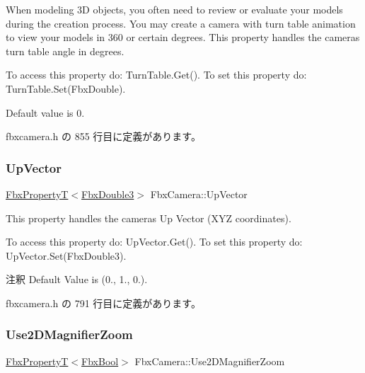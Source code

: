 When modeling 3D objects, you often need to review or evaluate your models during the creation process. You may create a camera with turn table animation to view your models in 360 or certain degrees. This property handles the camera\textquotesingle{}s turn table angle in degrees.

To access this property do\+: Turn\+Table.\+Get(). To set this property do\+: Turn\+Table.\+Set(\+Fbx\+Double).

Default value is 0. 

 fbxcamera.\+h の 855 行目に定義があります。

\mbox{\label{class_fbx_camera_ad2e9b17c1be832d71d4fc0eecc93732a}} 
\subsubsection{\texorpdfstring{Up\+Vector}{UpVector}}
{\footnotesize\ttfamily \hyperlink{class_fbx_property_t}{Fbx\+PropertyT}$<$\hyperlink{fbxtypes_8h_ae0a96f14cde566774c7553aa7523b7a7}{Fbx\+Double3}$>$ Fbx\+Camera\+::\+Up\+Vector}

This property handles the camera\textquotesingle{}s Up Vector (X\+YZ coordinates).

To access this property do\+: Up\+Vector.\+Get(). To set this property do\+: Up\+Vector.\+Set(\+Fbx\+Double3).

\begin{DoxyRemark}{注釈}
Default Value is (0., 1., 0.). 
\end{DoxyRemark}


 fbxcamera.\+h の 791 行目に定義があります。

\mbox{\label{class_fbx_camera_ad1e40e5371ba4003e8b21cfe0b8b42c7}} 
\subsubsection{\texorpdfstring{Use2\+D\+Magnifier\+Zoom}{Use2DMagnifierZoom}}
{\footnotesize\ttfamily \hyperlink{class_fbx_property_t}{Fbx\+PropertyT}$<$\hyperlink{fbxtypes_8h_a92e0562b2fe33e76a242f498b362262e}{Fbx\+Bool}$>$ Fbx\+Camera\+::\+Use2\+D\+Magnifier\+Zoom}

